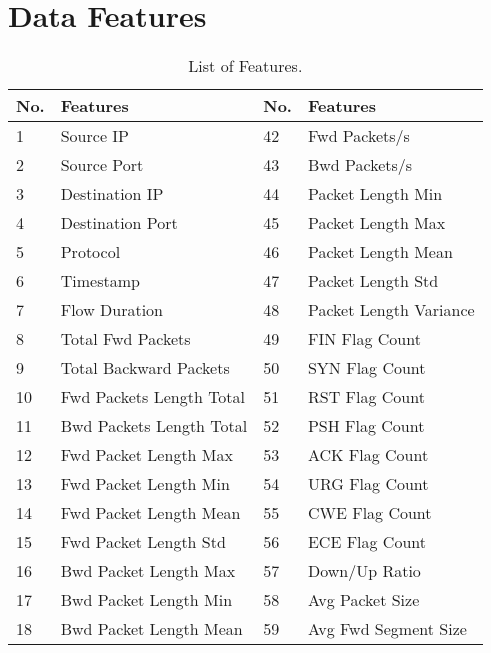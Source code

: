 \section{Data Features}\label{appendix:data_features}

\begin{center}
    \begin{longtable}{|l|l|l|l|}
        \caption{List of Features.} \\
        \hline
        \textbf{No.} & \textbf{Features} & \textbf{No.} & \textbf{Features} \\
        \hline
        1 & Source IP & 42 & Fwd Packets/s \\
        \hline
        2 & Source Port & 43 & Bwd Packets/s \\
        \hline
        3 & Destination IP & 44 & Packet Length Min \\
        \hline
        4 & Destination Port & 45 & Packet Length Max \\
        \hline
        5 & Protocol & 46 & Packet Length Mean \\
        \hline
        6 & Timestamp & 47 & Packet Length Std \\
        \hline
        7 & Flow Duration & 48 & Packet Length Variance \\
        \hline
        8 & Total Fwd Packets & 49 & FIN Flag Count \\
        \hline
        9 & Total Backward Packets & 50 & SYN Flag Count \\
        \hline
        10 & Fwd Packets Length Total & 51 & RST Flag Count \\
        \hline
        11 & Bwd Packets Length Total & 52 & PSH Flag Count \\
        \hline
        12 & Fwd Packet Length Max & 53 & ACK Flag Count \\
        \hline
        13 & Fwd Packet Length Min & 54 & URG Flag Count \\
        \hline
        14 & Fwd Packet Length Mean & 55 & CWE Flag Count \\
        \hline
        15 & Fwd Packet Length Std & 56 & ECE Flag Count \\
        \hline
        16 & Bwd Packet Length Max & 57 & Down/Up Ratio \\
        \hline
        17 & Bwd Packet Length Min & 58 & Avg Packet Size \\
        \hline
        18 & Bwd Packet Length Mean & 59 & Avg Fwd Segment Size \\

\end{longtable}
\end{center}
